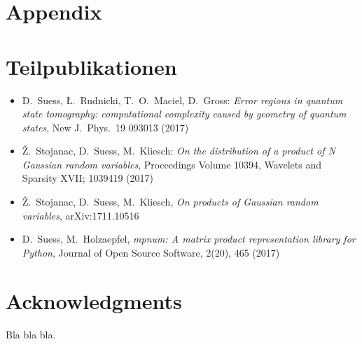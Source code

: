 \documentclass[
  a4paper,
  11pt,
  BCOR=8mm,
  twoside,
  headsepline]{scrbook}
\begin{document}
\tableofcontents

\mainmatter









\appendix

\chapter{Appendix}%





\printbibliography[heading=bibintoc]

\clearpage
\chapter*{Teilpublikationen}
\pagestyle{empty}
\begin{itemize}
  \item D.\ Suess, Ł.\ Rudnicki, T.\ O.\ Maciel, D.\ Gross: \textit{Error regions in quantum state tomography: computational complexity caused by geometry of quantum states}, New J.\ Phys.\ 19 093013 (2017)
  \item Ž.\ Stojanac, D.\ Suess, M.\ Kliesch: \textit{On the distribution of a product of N Gaussian random variables}, Proceedings Volume 10394, Wavelets and Sparsity XVII; 1039419 (2017)
  \item Ž.\ Stojanac, D.\ Suess, M.\ Kliesch, \textit{On products of Gaussian random variables}, arXiv:1711.10516
  \item D.\ Suess, M.\ Holzaepfel, \textit{mpnum: A matrix product representation library for Python}, Journal of Open Source Software, 2(20), 465 (2017)
\end{itemize}
\clearpage
\chapter*{Acknowledgments}
\pagestyle{empty}
Bla bla bla.
\end{document}
